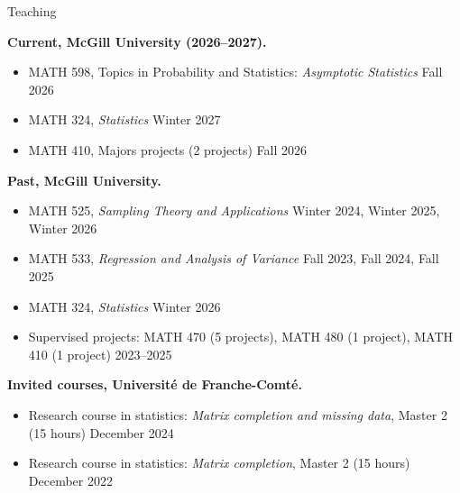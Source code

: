 \documentclass{resume}
\begin{document}
\begin{rSection}{Teaching}
\vspace{2mm}

\textbf{Current, McGill University (2026--2027).}
\begin{itemize}
  \item[--] MATH 598, Topics in Probability and Statistics: \emph{Asymptotic Statistics} \hfill Fall 2026
  \item[--] MATH 324, \emph{Statistics} \hfill Winter 2027
  \item[--] MATH 410, Majors projects (2 projects) \hfill Fall 2026
\end{itemize}

\textbf{Past, McGill University.}
\begin{itemize}
  \item[--] MATH 525, \emph{Sampling Theory and Applications} \hfill Winter 2024, Winter 2025, Winter 2026
  \item[--] MATH 533, \emph{Regression and Analysis of Variance} \hfill Fall 2023, Fall 2024, Fall 2025
  \item[--] MATH 324, \emph{Statistics} \hfill Winter 2026
  \item[--] Supervised projects: MATH 470 (5 projects), MATH 480 (1 project), MATH 410 (1 project) \hfill 2023--2025
\end{itemize}

\textbf{Invited courses, Université de Franche-Comté.}
\begin{itemize}
  \item[--] Research course in statistics: \emph{Matrix completion and missing data}, Master 2 (15 hours) \hfill December 2024
  \item[--] Research course in statistics: \emph{Matrix completion}, Master 2 (15 hours) \hfill December 2022
\end{itemize}


\end{rSection}
\end{document}
